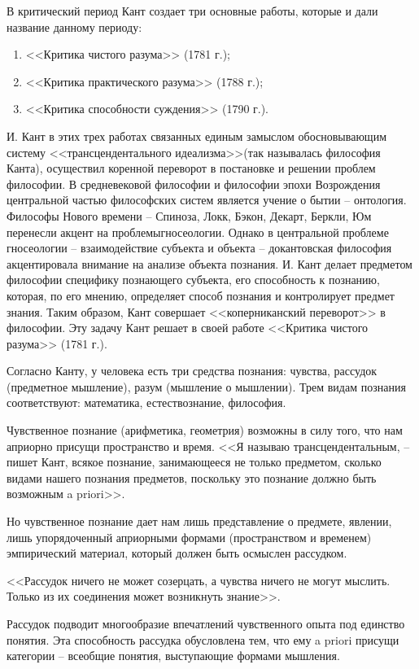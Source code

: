 \documentclass[12pt,a4paper]{article}
\begin{document}
	В критический период Кант создает три основные работы, которые и дали название данному периоду:
	\begin{enumerate}
		\item 	<<Критика чистого разума>> (1781 г.);
		\item 	<<Критика практического разума>> (1788 г.);
		\item 	<<Критика способности суждения>> (1790 г.).
	\end{enumerate}
	И. Кант в этих трех работах связанных единым замыслом обосновывающим систему <<трансцендентального идеализма>>(так называлась философия Канта), осуществил коренной переворот в постановке и решении проблем философии. В средневековой философии и философии эпохи Возрождения центральной частью философских систем является учение о бытии – онтология. Философы Нового времени – Спиноза, Локк, Бэкон, Декарт, Беркли, Юм перенесли акцент на проблемыгносеологии. Однако в центральной проблеме гносеологии – взаимодействие субъекта и объекта – докантовская философия акцентировала внимание на анализе объекта познания. И. Кант делает предметом философии специфику познающего субъекта, его способность к познанию, которая, по его мнению, определяет способ познания и контролирует предмет знания. Таким образом, Кант совершает <<коперниканский переворот>> в философии. Эту задачу Кант решает в своей работе <<Критика чистого разума>> (1781 г.).
	
	Согласно Канту, у человека есть три средства познания: чувства, рассудок (предметное мышление), разум (мышление о мышлении).
	Трем видам познания соответствуют: математика, естествознание, философия.
	
	Чувственное познание (арифметика, геометрия) возможны в силу того, что нам априорно присущи пространство и время. <<Я называю трансцендентальным, – пишет Кант, всякое познание, занимающееся не только предметом, сколько видами нашего познания предметов, поскольку это познание должно быть возможным a priori>>.
	
	Но чувственное познание дает нам лишь представление о предмете, явлении, лишь упорядоченный априорными формами (пространством и временем) эмпирический материал, который должен быть осмыслен рассудком.
	
	<<Рассудок ничего не может созерцать, а чувства ничего не могут мыслить. Только из их соединения может возникнуть знание>>.
	
	Рассудок подводит многообразие впечатлений чувственного опыта под единство понятия. Эта способность рассудка обусловлена тем, что ему a priori присущи категории – всеобщие понятия, выступающие формами мышления.
	
\end{document}
